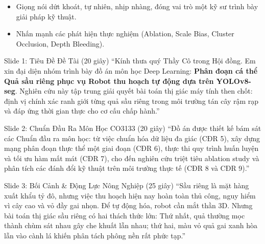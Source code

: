 \documentclass[11pt,a4paper]{article}
\begin{document}
\begin{tcolorbox}[colback=blue!8!white,colframe=blue!80!black,title=\textbf{HƯỚNG DẪN THUYẾT TRÌNH TRỰC DIỆN (TỔNG THỜI GIAN: 480 GIÂY)}]
\begin{itemize}[leftmargin=1.5em]
    \item Giọng nói dứt khoát, tự nhiên, nhịp nhàng, đóng vai trò một kỹ sư trình bày giải pháp kỹ thuật.
    \item Nhấn mạnh các phát hiện thực nghiệm (Ablation, Scale Bias, Cluster Occlusion, Depth Bleeding).
\end{itemize}
\end{tcolorbox}

\vspace{6pt}

\begin{scriptbox}{Slide 1: Tiêu Đề Đề Tài (20 giây)}
``Kính thưa quý Thầy Cô trong Hội đồng. Em xin đại diện nhóm trình bày đồ án môn học Deep Learning: \textbf{Phân đoạn cá thể Quả sầu riêng phục vụ Robot thu hoạch tự động dựa trên YOLOv8-seg}. Nghiên cứu này tập trung giải quyết bài toán thị giác máy tính then chốt: định vị chính xác ranh giới từng quả sầu riêng trong môi trường tán cây rậm rạp và đáp ứng thời gian thực cho cơ cấu chấp hành.''
\end{scriptbox}

\vspace{4pt}

\begin{scriptbox}{Slide 2: Chuẩn Đầu Ra Môn Học CO3133 (20 giây)}
``Đồ án được thiết kế bám sát các Chuẩn đầu ra môn học: từ việc chuẩn hóa dữ liệu đa giác (CĐR 5), xây dựng mạng phân đoạn thực thể một giai đoạn (CĐR 6), thực thi quy trình huấn luyện và tối ưu hàm mất mát (CĐR 7), cho đến nghiên cứu triệt tiêu ablation study và phân tích các đánh đổi kỹ thuật trên môi trường thực tế (CĐR 8 và CĐR 9).''
\end{scriptbox}

\vspace{4pt}

\begin{scriptbox}{Slide 3: Bối Cảnh \& Động Lực Nông Nghiệp (25 giây)}
``Sầu riêng là mặt hàng xuất khẩu tỷ đô, nhưng việc thu hoạch hiện nay hoàn toàn thủ công, nguy hiểm vì cây cao và vỏ đầy gai nhọn. Để tự động hóa, robot cần mắt thần 3D. Nhưng bài toán thị giác sầu riêng có hai thách thức lớn: Thứ nhất, quả thường mọc thành chùm sát nhau gây che khuất lẫn nhau; thứ hai, màu vỏ quả gai xanh hòa lẫn vào cành lá khiến phân tách phông nền rất phức tạp.''
\end{scriptbox}
\end{document}
